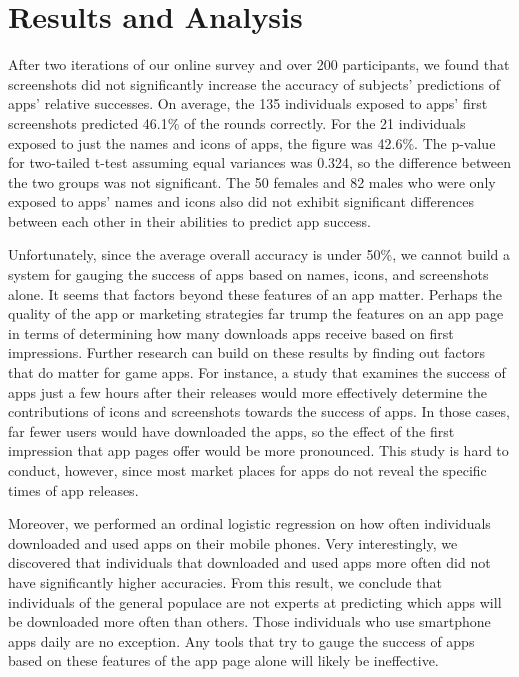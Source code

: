 \section{Results and Analysis}


After two iterations of our online survey and over 200 participants, we found that screenshots did not significantly increase the accuracy of subjects' predictions of apps' relative successes. On average, the 135 individuals exposed to apps' first screenshots predicted 46.1\% of the rounds correctly. For the 21 individuals exposed to just the names and icons of apps, the figure was 42.6\%. The p-value for two-tailed t-test assuming equal variances was 0.324, so the difference between the two groups was not significant. The 50 females and 82 males who were only exposed to apps' names and icons also did not exhibit significant differences between each other in their abilities to predict app success.

Unfortunately, since the average overall accuracy is under 50\%, we cannot build a system for gauging the success of apps based on names, icons, and screenshots alone. It seems that factors beyond these features of an app matter. Perhaps the quality of the app or marketing strategies far trump the features on an app page in terms of determining how many downloads apps receive based on first impressions. Further research can build on these results by finding out factors that do matter for game apps. For instance, a study that examines the success of apps just a few hours after their releases would more effectively determine the contributions of icons and screenshots towards the success of apps. In those cases, far fewer users would have downloaded the apps, so the effect of the first impression that app pages offer would be more pronounced. This study is hard to conduct, however, since most market places for apps do not reveal the specific times of app releases.

Moreover, we  performed an ordinal logistic regression on how often individuals downloaded and used apps on their mobile phones. Very interestingly, we discovered that individuals that downloaded and used apps more often did not have significantly higher accuracies. From this result, we conclude that individuals of the general populace are not experts at predicting which apps will be downloaded more often than others. Those individuals who use smartphone apps daily are no exception. Any tools that try to gauge the success of apps based on these features of the app page alone will likely be ineffective.
